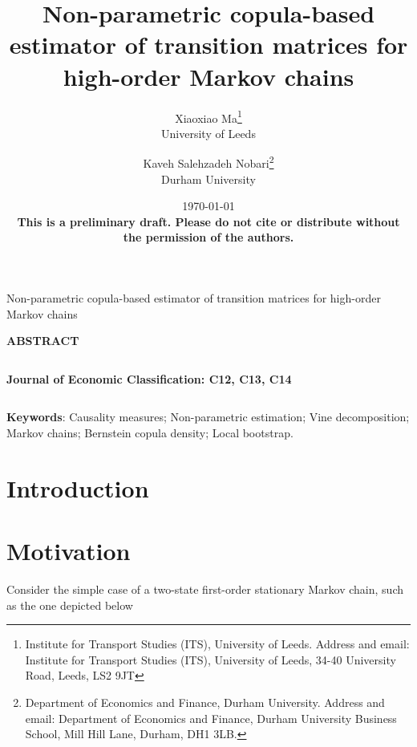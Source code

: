 \documentclass[harvard,11pt]{article}
\renewcommand{\cite}{\citeasnoun}
\renewcommand{\baselinestretch}{1.5}
\begin{document}
\title{{Non-parametric copula-based estimator of transition matrices for high-order Markov chains}}
\author{Xiaoxiao Ma\thanks{%
Institute for Transport Studies (ITS), University of Leeds. Address and email:
Institute for Transport Studies (ITS), University of Leeds, 34-40 University Road, Leeds, LS2 9JT}\\
University of Leeds\and Kaveh Salehzadeh Nobari\thanks{%
Department of Economics and Finance, Durham University. Address and email:
Department of Economics and Finance, Durham University Business School, Mill
Hill Lane, Durham, DH1 3LB.}\\
Durham University}
\date{\today \\
\textbf{This is a preliminary draft. Please do not cite or distribute without the permission of the authors.}}
\maketitle

\setlength{\baselineskip}{18pt}\pagestyle{plain}\newpage

\begin{center}
$\left. {}\right. ${\LARGE Non-parametric copula-based estimator of transition matrices for high-order Markov chains}%
\begin{equation*}
\end{equation*}

\textbf{ABSTRACT}
\end{center}

\noindent \lipsum[2-3]

$\left. {}\right.$

\noindent \textbf{Journal of Economic Classification: C12, C13, C14%
}

$\left. {}\right. $

\noindent \textbf{Keywords}: Causality measures; Non-parametric estimation; Vine decomposition; Markov chains; Bernstein copula density; Local bootstrap.\newpage

\tableofcontents%
\newpage

\section{Introduction \label{Introduction}}

\section{Motivation \label{Motivation}}
Consider the simple case of a two-state first-order stationary Markov chain, such as the one depicted below
\end{document}
